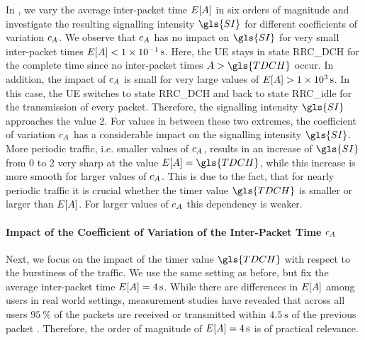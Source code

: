 In , we vary the average inter-packet time \(E[A]\) in six orders of magnitude and investigate the resulting signalling intensity \(\gls{SI}\) for different coefficients of variation \(c_{A}\).
We observe that \(c_{A}\) has no impact on \(\gls{SI}\) for very small inter-packet times \(E[A]<\SI{1e-1}{\second}\).
Here, the \gls{UE} stays in state \gls{RRC_DCH} for the complete time since no inter-packet times \(\PacketIAT>\gls{TDCH}\) occur.
In addition, the impact of \(c_{A}\) is small for very large values of \(E[A]>\SI{1e3}{\second}\).
In this case, the \gls{UE} switches to state \gls{RRC_DCH} and back to state \gls{RRC_idle} for the transmission of every packet. Therefore, the signalling intensity \(\gls{SI}\) approaches the value 2.
For values in between these two extremes, the coefficient of variation \(c_{A}\) has a considerable impact on the signalling intensity \(\gls{SI}\).
More periodic traffic, i.e. smaller values of \(c_{A}\), results in an increase of \(\gls{SI}\) from 0 to 2 very sharp at the value \(E[\PacketIAT]=\gls{TDCH}\), while this increase is more smooth for larger values of \(c_{A}\).
This is due to the fact, that for nearly periodic traffic it is crucial whether the timer value \(\gls{TDCH}\) is smaller or larger than \(E[A]\). 
For larger values of \(c_{A}\) this dependency is weaker.

\paragraph*{Impact of the Coefficient of Variation of the Inter-Packet Time \(c_A\)}

Next, we focus on the impact of the timer value \(\gls{TDCH}\) with respect to the burstiness of the traffic.
We use the same setting as before, but fix the average inter-packet time \(E[A]=\SI{4}{\second}\).
While there are differences in \(E[A]\) among users in real world settings, measurement studies have revealed that across all users \(\SI{95}{\percent}\) of the packets are received or transmitted within \(\SI{4.5}{\second}\) of the previous packet \cite{Falaki2010a}.
Therefore, the order of magnitude of \(E[A]=\SI{4}{\second}\) is of practical relevance. 

